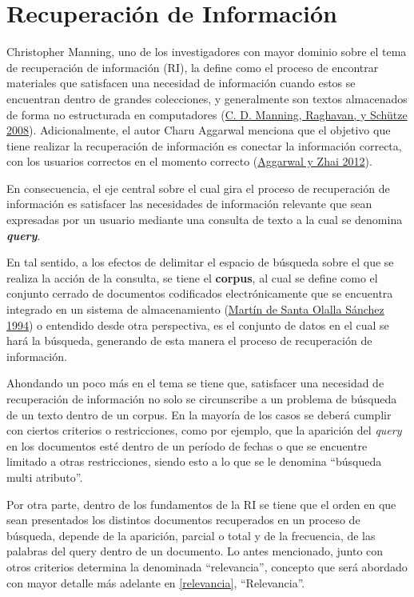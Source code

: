 \documentclass[
  12pt,
  openany]{book}
\begin{document}
\hypertarget{infret}{%
\section{Recuperación de Información}\label{infret}}

Christopher Manning, uno de los investigadores con mayor dominio sobre el tema de recuperación de información (RI), la define como el proceso de encontrar materiales que satisfacen una necesidad de información cuando estos se encuentran dentro de grandes colecciones, y generalmente son textos almacenados de forma no estructurada en computadores (\protect\hyperlink{ref-manning2008}{C. D. Manning, Raghavan, y Schütze 2008}). Adicionalmente, el autor Charu Aggarwal menciona que el objetivo que tiene realizar la recuperación de información es conectar la información correcta, con los usuarios correctos en el momento correcto (\protect\hyperlink{ref-miningt2012}{Aggarwal y Zhai 2012}).

En consecuencia, el eje central sobre el cual gira el proceso de recuperación de información es satisfacer las necesidades de información relevante que sean expresadas por un usuario mediante una consulta de texto a la cual se denomina \textbf{\emph{query}}.

En tal sentido, a los efectos de delimitar el espacio de búsqueda sobre el que se realiza la acción de la consulta, se tiene el \textbf{corpus}, al cual se define como el conjunto cerrado de documentos codificados electrónicamente que se encuentra integrado en un sistema de almacenamiento (\protect\hyperlink{ref-martiaurora}{Martín de Santa Olalla Sánchez 1994}) o entendido desde otra perspectiva, es el conjunto de datos en el cual se hará la búsqueda, generando de esta manera el proceso de recuperación de información.

Ahondando un poco más en el tema se tiene que, satisfacer una necesidad de recuperación de información no solo se circunscribe a un problema de búsqueda de un texto dentro de un corpus. En la mayoría de los casos se deberá cumplir con ciertos criterios o restricciones, como por ejemplo, que la aparición del \emph{query} en los documentos esté dentro de un período de fechas o que se encuentre limitado a otras restricciones, siendo esto a lo que se le denomina ``búsqueda multi atributo''.

Por otra parte, dentro de los fundamentos de la RI se tiene que el orden en que sean presentados los distintos documentos recuperados en un proceso de búsqueda, depende de la aparición, parcial o total y de la frecuencia, de las palabras del query dentro de un documento. Lo antes mencionado, junto con otros criterios determina la denominada ``relevancia'', concepto que será abordado con mayor detalle más adelante en \ref{relevancia}, ``Relevancia''.
\end{document}
